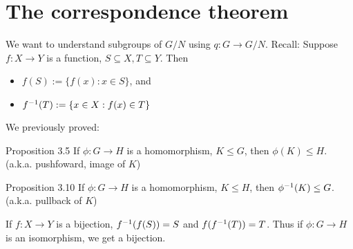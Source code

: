 \section{The correspondence theorem}
We want to understand subgroups of $G/N$ using $q:G\to G/N$. Recall: Suppose $f:X\to Y$ is a function, $S\subseteq X, T\subseteq Y$. Then 
\begin{itemize}
	\item $f(S):= \{f(x):x\in S\}$, and 
	\item $f^{-1} (T):=\{x\in X: f(x)\in T\}$
\end{itemize}
We previously proved:
\begin{law}{Proposition 3.5}
If $\phi:G\to H$ is a homomorphism, $K\le G$, then $\phi(K)\le H$. (a.k.a. pushfoward, image of $K$)
\end{law}

\begin{law}{Proposition 3.10}
	If $\phi:G\to H$ is a homomorphism, $K\le H$, then $\phi^{-1}(K)\le G$. (a.k.a. pullback of $K$)
\end{law}

If $f:X\to Y$ is a bijection, $f^{-1}(f(S))=S$ and $f(f^{-1} (T))=T$. Thus if $\phi:G\to H$ is an isomorphism, we get a bijection.

